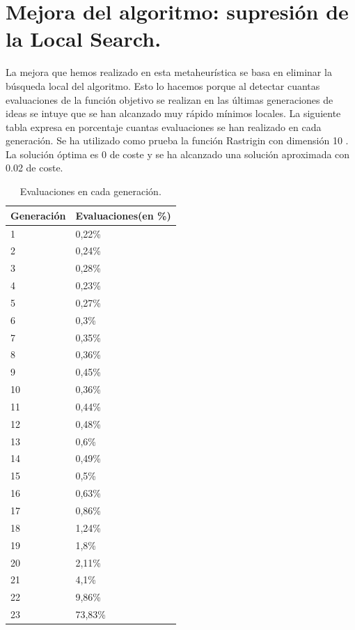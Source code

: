 \newpage

\section{Mejora del algoritmo: supresión de la Local Search.}

La mejora que hemos realizado en esta metaheurística se basa en eliminar la búsqueda local del algoritmo. Esto lo hacemos porque al detectar cuantas evaluaciones de la función objetivo se realizan en las últimas generaciones de ideas se intuye que se han alcanzado muy rápido mínimos locales. La siguiente tabla expresa en porcentaje cuantas evaluaciones se han realizado en cada generación. Se ha utilizado como prueba la función Rastrigin con dimensión 10	. La solución óptima es 0 de coste y se ha alcanzado una solución aproximada con 0.02 de coste. \\

\begin{table}[htbp]
	\begin{center}
		\begin{tabular}{|l|l|}
			\hline
			Generación & Evaluaciones(en \%) \\
			\hline \hline
			1 & 0,22\% \\ \hline
			2 & 0,24\% \\ \hline
			3 & 0,28\% \\ \hline
			4 & 0,23\% \\ \hline
			5 & 0,27\% \\ \hline
			6 & 0,3\% \\ \hline
			7 & 0,35\% \\ \hline
			8 & 0,36\% \\ \hline
			9 & 0,45\% \\ \hline
			10 & 0,36\% \\ \hline
			11 & 0,44\% \\ \hline
			12 & 0,48\% \\ \hline
			13 & 0,6\% \\ \hline
			14 & 0,49\% \\ \hline
			15 & 0,5\% \\ \hline
			16 & 0,63\% \\ \hline
			17 & 0,86\% \\ \hline
			18 & 1,24\% \\ \hline
			19 & 1,8\% \\ \hline
			20 & 2,11\% \\ \hline
			21 & 4,1\% \\ \hline
			22 & 9,86\% \\ \hline
			23 & 73,83\% \\ \hline
			
		\end{tabular}
		\caption{Evaluaciones en cada generación.}
		\label{tabla:evaluacionesGeneraciones}
	\end{center}
\end{table}

